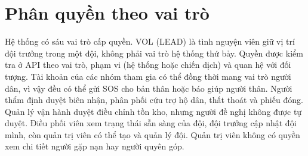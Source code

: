 \documentclass[12pt,a4paper,oneside]{report}
\begin{document}
\section{Phân quyền theo vai trò}
Hệ thống có sáu vai trò cấp quyền. VOL (LEAD) là tình nguyện viên giữ vị trí đội trưởng trong một đội, không phải vai trò hệ thống thứ bảy. Quyền được kiểm tra ở API theo vai trò, phạm vi (hệ thống hoặc chiến dịch) và quan hệ với đối tượng. Tài khoản của các nhóm tham gia có thể đồng thời mang vai trò người dân, vì vậy đều có thể gửi SOS cho bản thân hoặc báo giúp người thân. Người thẩm định duyệt biên nhận, phân phối cứu trợ hộ dân, thất thoát và phiếu đóng. Quản lý vận hành duyệt điều chỉnh tồn kho, nhưng người đề nghị không được tự duyệt. Điều phối viên xem trạng thái sẵn sàng của đội, đội trưởng cập nhật đội mình, còn quản trị viên có thể tạo và quản lý đội. Quản trị viên không có quyền xem chi tiết người gặp nạn hay người quyên góp.
\clearpage
\end{document}

